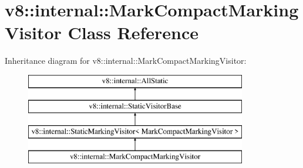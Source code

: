 \hypertarget{classv8_1_1internal_1_1_mark_compact_marking_visitor}{}\section{v8\+:\+:internal\+:\+:Mark\+Compact\+Marking\+Visitor Class Reference}
\label{classv8_1_1internal_1_1_mark_compact_marking_visitor}
Inheritance diagram for v8\+:\+:internal\+:\+:Mark\+Compact\+Marking\+Visitor\+:\begin{figure}[H]
\begin{center}
\leavevmode
\includegraphics[height=4.000000cm]{classv8_1_1internal_1_1_mark_compact_marking_visitor}
\end{center}
\end{figure}
